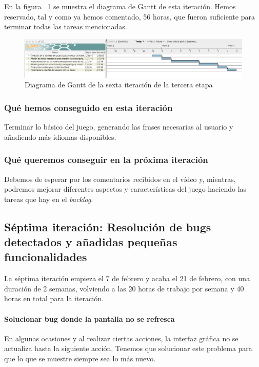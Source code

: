 En la figura ~\ref{fig:sec3it6} se muestra el diagrama de Gantt de esta iteración. Hemos reservado, tal y como ya hemos comentado, 56 horas, que fueron suficiente para terminar todas las tareas mencionadas.

\begin{figure}
    \includegraphics[width=\textwidth,height=\textheight,keepaspectratio]{./img/sec3it6.png}
  \caption{Diagrama de Gantt de la sexta iteración de la tercera etapa}
  \label{fig:sec3it6}
\end{figure}

\subsubsection{Qué hemos conseguido en esta iteración}

Terminar lo básico del juego, generando las frases necesarias al usuario y añadiendo más idiomas disponibles.

\subsubsection{Qué queremos conseguir en la próxima iteración}

Debemos de esperar por los comentarios recibidos en el vídeo y, mientras, podremos mejorar diferentes aspectos y características del juego haciendo las tareas que hay en el \textit{backlog}.

\subsection{Séptima iteración: Resolución de bugs detectados y añadidas pequeñas funcionalidades}

La séptima iteración empieza el 7 de febrero y acaba el 21 de febrero, con una duración de 2 semanas, volviendo a las 20 horas de trabajo por semana y 40 horas en total para la iteración.

\paragraph{Solucionar bug donde la pantalla no se refresca} En algunas ocasiones y al realizar ciertas acciones, la interfaz gráfica no se actualiza hasta la siguiente acción. Tenemos que solucionar este problema para que lo que se muestre siempre sea lo más nuevo.

